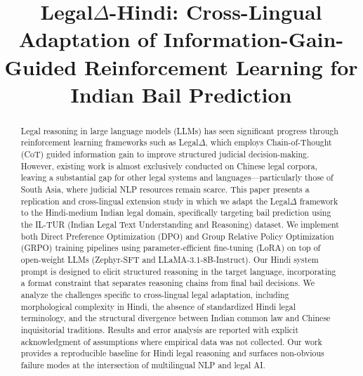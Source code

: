 \documentclass[conference]{IEEEtran}
\begin{document}
\title{Legal$\Delta$-Hindi: Cross-Lingual Adaptation of Information-Gain-Guided Reinforcement Learning for Indian Bail Prediction}

\author{
}

\maketitle

\begin{abstract}
Legal reasoning in large language models (LLMs) has seen significant progress through reinforcement learning frameworks such as Legal$\Delta$, which employs Chain-of-Thought (CoT) guided information gain to improve structured judicial decision-making. However, existing work is almost exclusively conducted on Chinese legal corpora, leaving a substantial gap for other legal systems and languages—particularly those of South Asia, where judicial NLP resources remain scarce. This paper presents a replication and cross-lingual extension study in which we adapt the Legal$\Delta$ framework to the Hindi-medium Indian legal domain, specifically targeting bail prediction using the IL-TUR (Indian Legal Text Understanding and Reasoning) dataset. We implement both Direct Preference Optimization (DPO) and Group Relative Policy Optimization (GRPO) training pipelines using parameter-efficient fine-tuning (LoRA) on top of open-weight LLMs (Zephyr-SFT and LLaMA-3.1-8B-Instruct). Our Hindi system prompt is designed to elicit structured reasoning in the target language, incorporating a format constraint that separates reasoning chains from final bail decisions. We analyze the challenges specific to cross-lingual legal adaptation, including morphological complexity in Hindi, the absence of standardized Hindi legal terminology, and the structural divergence between Indian common law and Chinese inquisitorial traditions. Results and error analysis are reported with explicit acknowledgment of assumptions where empirical data was not collected. Our work provides a reproducible baseline for Hindi legal reasoning and surfaces non-obvious failure modes at the intersection of multilingual NLP and legal AI.
\end{abstract}
\end{document}
